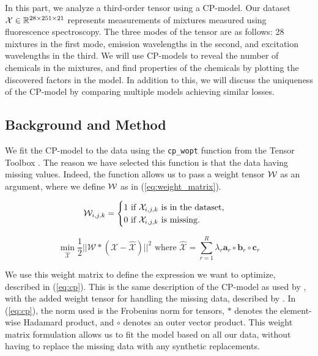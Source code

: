 In this part, we analyze a third-order tensor using a CP-model.
Our dataset $\mathcal{X}\in \mathbb{R}^{28 \times 251 \times 21}$ represents measurements of mixtures measured using fluorescence spectroscopy.
The three modes of the tensor are as follows: 28 mixtures in the first mode, emission wavelengths in the second, and excitation wavelengths in the third.
We will use CP-models to reveal the number of chemicals in the mixtures, and find properties of the chemicals by plotting the discovered factors in the model.
In addition to this, we will discuss the uniqueness of the CP-model by comparing multiple models achieving similar losses.


\subsection*{Background and Method}

We fit the CP-model to the data using the \texttt{cp\_wopt} function from the Tensor Toolbox \cite{tentool}.
The reason we have selected this function is that the data having missing values.
Indeed, the function allows us to pass a weight tensor $\mathcal{W}$ as an argument, where we define $\mathcal{W}$ as in (\ref{eq:weight_matrix}).


\begin{equation}
\mathcal{W}_{i,j,k} = \begin{cases}
    1 \ \text{if} \ \mathcal{X}_{i,j,k} \ \text{is in the dataset,} \\
    0 \ \text{if} \ \mathcal{X}_{i,j,k} \ \text{is missing.}
\end{cases}
\label{eq:weight_matrix}
\end{equation}

\begin{equation}
    \min_{ \mathcal{\hat{X}}} \frac{1}{2} ||\mathcal{W} * (\mathcal{X} - \mathcal{\hat{X}})||^2 \text{  where } \mathcal{\hat{X}} = \sum_{r = 1}^{R} \lambda_r \mathbf{a}_r \circ \mathbf{b}_r \circ \mathbf{c}_r
    \label{eq:cp}
\end{equation}

We use this weight matrix to define the expression we want to optimize, described in (\ref{eq:cp}).
This is the same description of the CP-model as used by \textcite{tensor-review}, with the added weight tensor for handling the missing data, described by \textcite{cp-wopt}.
In (\ref{eq:cp}), the norm used is the Frobenius norm for tensors, $*$ denotes the element-wise Hadamard product, and $\circ$ denotes an outer vector product.
This weight matrix formulation allows us to fit the model based on all our data, without having to replace the missing data with any synthetic replacements.

